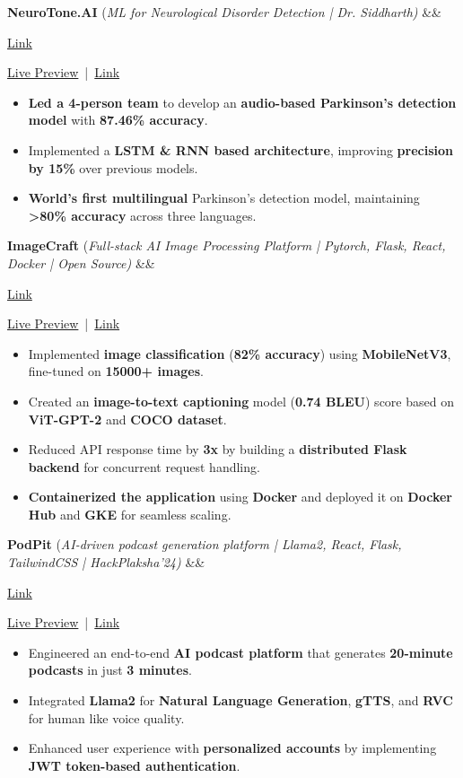 \documentclass[letterpaper]{article}
\newcommand{\bulletSep} { \vspace{1.5mm} }
\newcommand{\linkFont}[1]{
    {\fontfamily{lmtt}\selectfont#1}
}
\newcommand{\link}[2]{
    {\fontfamily{lmtt}\selectfont\href{#1}{#2}}
}
\newcommand{\projectItem}[5]{
    {\textbf{#1}} {(\sl #2)}\hfill
    \ifx&#3&%
    \link{#4}{Link}\\
    \else
    \linkFont{\href{#3}{Live Preview}~|~\href{#4}{Link}}\\
    \fi
    \vspace{2pt}
    \begin{itemize}
        #5
    \end{itemize}
}
\begin{document}
\projectItem{NeuroTone.AI}{ML for Neurological Disorder Detection | Dr. Siddharth} {}{https://ai3011.plaksha.edu.in/spring2024.html\#parkinson}{
    \item \textbf{Led a 4-person team} to develop an \textbf{audio-based Parkinson's detection model} with \textbf{87.46\% accuracy}.     \vspace{0.5mm}


    \item Implemented a \textbf{LSTM \& RNN based architecture}, improving \textbf{precision by 15\%} over previous models.     \vspace{0.5mm}

    \item \textbf{World's first multilingual} Parkinson's detection model, maintaining \textbf{>80\% accuracy} across three languages.
}
\bulletSep

\projectItem{ImageCraft}{Full-stack AI Image Processing Platform | Pytorch, Flask, React, Docker | Open Source}{}{https://github.com/pratikranaa/imagecraft}{    

    \item Implemented \textbf{image classification} (\textbf{82\% accuracy}) using \textbf{MobileNetV3}, fine-tuned on \textbf{15000+ images}.     \vspace{0.5mm}

    \item Created an \textbf{image-to-text captioning} model (\textbf{0.74 BLEU}) score based on \textbf{ViT-GPT-2} and \textbf{COCO dataset}.     \vspace{0.5mm}

    \item Reduced API response time by \textbf{3x} by building a \textbf{distributed Flask backend} for concurrent request handling.     \vspace{0.5mm}

    \item \textbf{Containerized the application} using \textbf{Docker} and deployed it on \textbf{Docker Hub} and \textbf{GKE} for seamless scaling.
}
\bulletSep

\projectItem{PodPit}{AI-driven podcast generation platform | Llama2, React, Flask, TailwindCSS | HackPlaksha’24}{}{https://devfolio.co/projects/podnews-1159}{

    \item Engineered an end-to-end \textbf{AI podcast  platform} that generates \textbf{20-minute podcasts} in just \textbf{3 minutes}.     \vspace{0.5mm}

    \item Integrated \textbf{Llama2} for \textbf{Natural Language Generation}, \textbf{gTTS}, and \textbf{RVC} for human like voice quality.    \vspace{0.5mm}

    \item Enhanced user experience with \textbf{personalized accounts} by implementing \textbf{JWT token-based authentication}.
}
\end{document}
